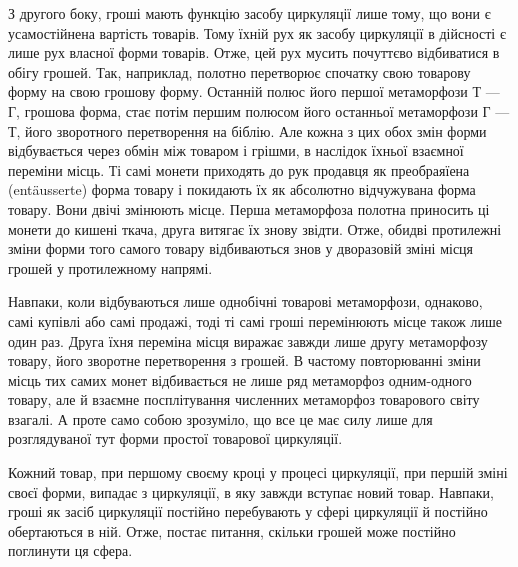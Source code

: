 З другого боку, гроші мають функцію засобу циркуляції
лише тому, що вони є усамостійнена вартість товарів. Тому їхній
рух як засобу циркуляції в дійсності є лише рух власної форми
товарів. Отже, цей рух мусить почуттєво відбиватися в обігу
грошей. Так, наприклад, полотно перетворює спочатку свою
товарову форму на свою грошову форму. Останній полюс його
першої метаморфози Т — Г, грошова форма, стає потім першим
полюсом його останньої метаморфози Г — Т, його зворотного
перетворення на біблію. Але кожна з цих обох змін форми відбувається
через обмін між товаром і грішми, в наслідок їхньої
взаємної переміни місць. Ті самі монети приходять до рук продавця
як преобраяїена (entäusserte) форма товару і покидають їх
як абсолютно відчужувана форма товару. Вони двічі змінюють
місце. Перша метаморфоза полотна приносить ці монети до кишені
ткача, друга витягає їх знову звідти. Отже, обидві протилежні
зміни форми того самого товару відбиваються знов у дворазовій
зміні місця грошей у протилежному напрямі.

Навпаки, коли відбуваються лише однобічні товарові метаморфози,
однаково, самі купівлі або самі продажі, тоді ті самі
гроші перемінюють місце також лише один раз. Друга їхня
переміна місця виражає завжди лише другу метаморфозу товару,
його зворотне перетворення з грошей. В частому повторюванні
зміни місць тих самих монет відбивається не лише ряд метаморфоз
одним-одного товару, але й взаємне посплітування численних
метаморфоз товарового світу взагалі. А проте само собою зрозуміло,
що все це має силу лише для розглядуваної тут форми
простої товарової циркуляції.

Кожний товар, при першому своєму кроці у процесі циркуляції,
при першій зміні своєї форми, випадає з циркуляції, в яку завжди
вступає новий товар. Навпаки, гроші як засіб циркуляції постійно
перебувають у сфері циркуляції й постійно обертаються
в ній. Отже, постає питання, скільки грошей може постійно поглинути
ця сфера.

